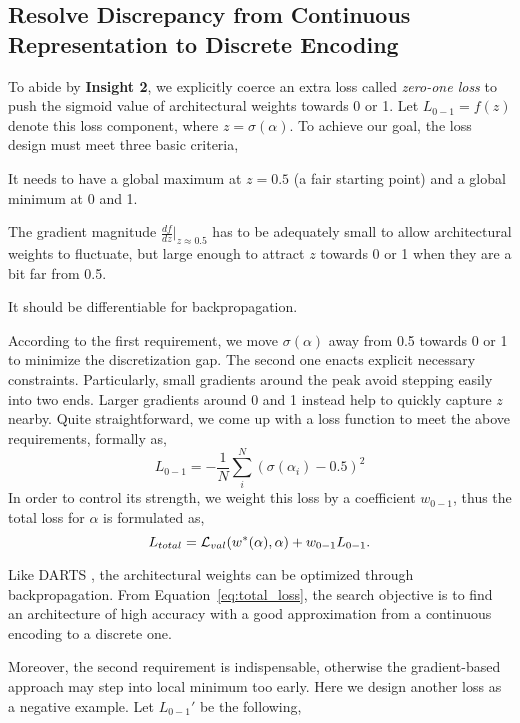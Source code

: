 \documentclass[runningheads]{llncs}
\begin{document}
\subsection{Resolve Discrepancy from Continuous Representation to Discrete Encoding}{\label{sec:loss}}
To abide by \textbf{Insight 2}, we explicitly coerce an extra loss called \emph{zero-one loss} to push the sigmoid value of architectural weights towards 0 or 1. Let $L_{0-1} = f(z)$ denote this loss component, where $z=\sigma(\alpha)$.  To achieve our goal, the loss design must meet three basic criteria, 
\begin{enumerate*}
\item It needs to have a global maximum at $z=0.5$ (a fair starting point) and a global minimum at 0 and 1.
\item The gradient magnitude $\frac{df}{dz}|_{z\approx0.5}$ has to be adequately small to allow architectural weights to fluctuate, but large enough to attract $z$ towards 0 or 1 when they are a bit far from 0.5.
\item It should be differentiable for backpropagation. 
\end{enumerate*}

According to the first requirement, we move $\sigma(\alpha)$ away from 0.5 towards 0 or 1 to minimize the discretization gap. The second one enacts explicit necessary constraints. Particularly, small gradients around the peak avoid stepping easily into two ends. Larger gradients around 0 and 1 instead help to quickly capture $z$ nearby. Quite straightforward, we come up with a loss function to meet the above requirements, formally as,
\begin{equation}
	L_{0-1} = -\frac{1}{N}\sum_{i}^{N}(\sigma(\alpha_i)-0.5)^2
\end{equation}
In order to control its strength, we weight this loss by a coefficient $w_{0-1}$, thus the total loss for $\alpha$ is formulated as, 
\begin{equation}{\label{eq:total_loss}}
	L_{total} = \mathcal{L}_{val} (w^*(\alpha), \alpha) + w_{0-1}L_{0-1}.
\end{equation}

Like DARTS \cite{liu2018darts}, the architectural weights can be optimized through backpropagation. From Equation~\ref{eq:total_loss}, the search objective is to find an architecture of high accuracy  with a good approximation from a continuous encoding to a discrete one.

Moreover, the second requirement is indispensable, otherwise the gradient-based approach may step into local minimum too early. Here we design another loss as a negative example. Let $L_{0-1}'$ be the following,
\end{document}
